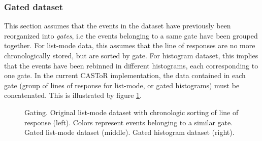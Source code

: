 \documentclass[a4paper, 11pt]{article}
\begin{document}
\subsubsection{Gated dataset}

This section assumes that the events in the dataset have previously been reorganized into \textit{gates}, i.e the events belonging to a same gate have been grouped together. For list-mode data, this assumes that the line of responses are no more chronologically stored, but are sorted by gate. For histogram dataset, this implies that the events have been rebinned in different histograms, each corresponding to one gate. In the current CASToR implementation, the data contained in each gate (group of lines of response for list-mode, or gated histograms) must be concatenated. This is illustrated by figure \ref{fig_gating}.



\begin{figure} [h]
  \centerline
  {
  }
  \caption{Gating. Original list-mode dataset with chronologic sorting of line of response (left). Colors represent events belonging to a similar gate. Gated list-mode dataset (middle). Gated histogram dataset (right).}
  \label{fig_gating}
\end{figure}
\end{document}
